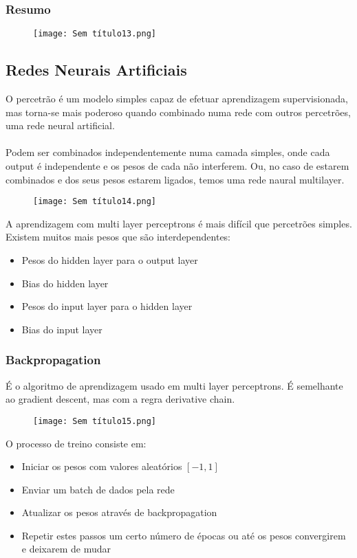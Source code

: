 \documentclass[10pt,a4paper]{report}
\begin{document}
\subsubsection{Resumo}
\begin{figure}[H]
\centering
\texttt{[image: Sem título13.png]}
\end{figure}
\subsection{Redes Neurais Artificiais}
O percetrão é um modelo simples capaz de efetuar aprendizagem supervisionada, mas torna-se mais poderoso quando combinado numa rede com outros percetrões, uma rede neural artificial.\\
\\
Podem ser combinados independentemente numa camada simples, onde cada output é independente e os pesos de cada não interferem. Ou, no caso de estarem combinados e dos seus pesos estarem ligados, temos uma rede naural multilayer.
\begin{figure}[H]
\centering
\texttt{[image: Sem título14.png]}
\end{figure}
A aprendizagem com multi layer perceptrons é mais difícil que percetrões simples. Existem muitos mais pesos que são interdependentes:
\begin{itemize}
\item Pesos do hidden layer para o output layer
\item Bias do hidden layer
\item Pesos do input layer para o hidden layer
\item Bias do input layer
\end{itemize}
\subsubsection{Backpropagation}
É o algoritmo de aprendizagem usado em multi layer perceptrons. É semelhante ao gradient descent, mas com a regra derivative chain.
\begin{figure}[H]
\centering
\texttt{[image: Sem título15.png]}
\end{figure}
O processo de treino consiste em:
\begin{itemize}
\item Iniciar os pesos com valores aleatórios $[-1,1]$
\item Enviar um batch de dados pela rede
\item Atualizar os pesos através de backpropagation
\item Repetir estes passos um certo número de épocas ou até os pesos convergirem e deixarem de mudar
\end{itemize}
\end{document}
